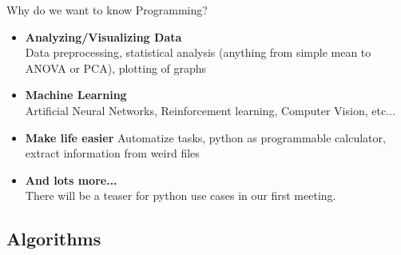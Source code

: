 \begin{frame}{Why do we want to know Programming?}

    \begin{itemize}
        \item \textbf{Analyzing/Visualizing Data} \\
        Data preprocessing, statistical analysis (anything from simple mean to ANOVA or PCA), plotting of graphs

        \item \textbf{Machine Learning} \\
        Artificial Neural Networks, Reinforcement learning, Computer Vision, etc...

        \item \textbf{Make life easier}
        Automatize tasks, python as programmable calculator, extract information from weird files

        \item \textbf{And lots more...} \\

There will be a teaser for python use cases in our first meeting.

    \end{itemize}


\end{frame}

\subsection{Algorithms}


